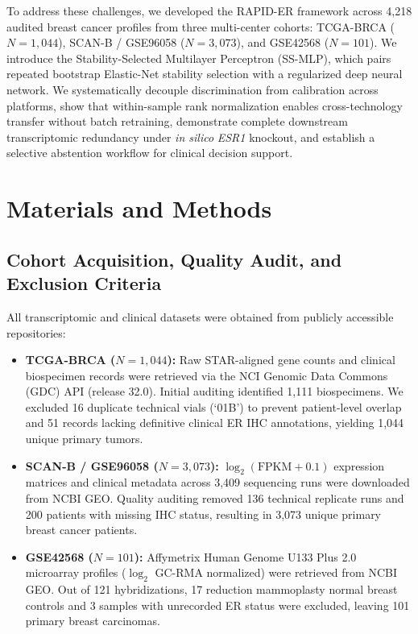 \documentclass[11pt,a4paper]{article}
\begin{document}
To address these challenges, we developed the RAPID-ER framework across 4,218 audited breast cancer profiles from three multi-center cohorts: TCGA-BRCA ($N = 1{,}044$), SCAN-B / GSE96058 ($N = 3{,}073$), and GSE42568 ($N = 101$). We introduce the Stability-Selected Multilayer Perceptron (SS-MLP), which pairs repeated bootstrap Elastic-Net stability selection with a regularized deep neural network. We systematically decouple discrimination from calibration across platforms, show that within-sample rank normalization enables cross-technology transfer without batch retraining, demonstrate complete downstream transcriptomic redundancy under \textit{in silico} \textit{ESR1} knockout, and establish a selective abstention workflow for clinical decision support.

\section{Materials and Methods}

\subsection{Cohort Acquisition, Quality Audit, and Exclusion Criteria}
All transcriptomic and clinical datasets were obtained from publicly accessible repositories:
\begin{itemize}
    \item \textbf{TCGA-BRCA ($N = 1{,}044$):} Raw STAR-aligned gene counts and clinical biospecimen records were retrieved via the NCI Genomic Data Commons (GDC) API (release 32.0). Initial auditing identified 1,111 biospecimens. We excluded 16 duplicate technical vials (`01B') to prevent patient-level overlap and 51 records lacking definitive clinical ER IHC annotations, yielding 1,044 unique primary tumors.
    \item \textbf{SCAN-B / GSE96058 ($N = 3{,}073$):} $\log_2(\text{FPKM} + 0.1)$ expression matrices and clinical metadata across 3,409 sequencing runs were downloaded from NCBI GEO. Quality auditing removed 136 technical replicate runs and 200 patients with missing IHC status, resulting in 3,073 unique primary breast cancer patients.
    \item \textbf{GSE42568 ($N = 101$):} Affymetrix Human Genome U133 Plus 2.0 microarray profiles ($\log_2$ GC-RMA normalized) were retrieved from NCBI GEO. Out of 121 hybridizations, 17 reduction mammoplasty normal breast controls and 3 samples with unrecorded ER status were excluded, leaving 101 primary breast carcinomas.
\end{itemize}
\end{document}
